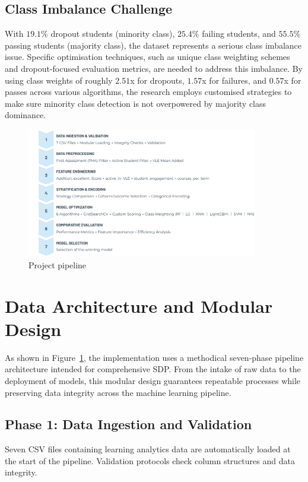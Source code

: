 \documentclass[ %
                    author={Carlos Duran Calle},
                supervisor={Dr. Felipe Campelo},
                    degree={MSc},
                     title={Comparative Machine Learning Analysis for Student Dropout Prediction in a Virtual Learning Environment},
                  subtitle={Incorporating Student Engagement and Socio-Economic Features},
                      type={},
                      year={2025}]{dissertation}
\begin{document}
\subsection{Class Imbalance Challenge}
With $19.1\%$ dropout students (minority class), $25.4\%$ failing students, and $55.5\%$ passing students (majority class), the dataset represents a serious class imbalance issue. Specific optimisation techniques, such as unique class weighting schemes and dropout-focused evaluation metrics, are needed to address this imbalance. By using class weights of roughly $2.51$x for dropouts, $1.57$x for failures, and $0.57$x for passes across various algorithms, the research employs customised strategies to make sure minority class detection is not overpowered by majority class dominance.

\begin{figure}[t]
	\centering
	\includegraphics[width=0.9\textwidth]{../Visualizations/Report/3_1_project_pipeline.png}
	\caption{Project pipeline}
	\label{project_pipeline}
\end{figure}

\section{Data Architecture and Modular Design}
As shown in Figure~\ref{project_pipeline}, the implementation uses a methodical seven-phase pipeline architecture intended for comprehensive SDP. From the intake of raw data to the deployment of models, this modular design guarantees repeatable processes while preserving data integrity across the machine learning pipeline.

\subsection{Phase 1: Data Ingestion and Validation}
Seven CSV files containing learning analytics data are automatically loaded at the start of the pipeline. Validation protocols check column structures and data integrity.
\end{document}
